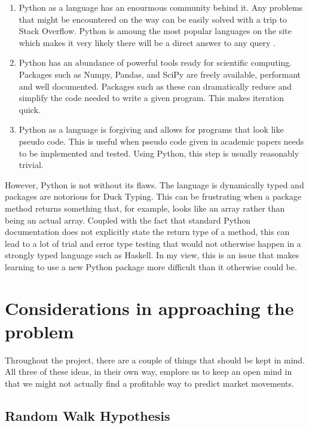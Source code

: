 \documentclass{report}
\begin{document}
\begin{enumerate}
  \item Python as a language has an enourmous community behind it. Any problems that might be encountered on the way can be easily solved with a trip to Stack Overflow. Python is amoung the most popular languages on the site which makes it very likely there will be a direct answer to any query \cite{website:redmonk-languages}. 
  
  \item Python has an abundance of powerful tools ready for scientific computing. Packages such as Numpy, Pandas, and SciPy are freely available, performant and well documented. Packages such as these can dramatically reduce and simplify the code needed to write a given program. This makes iteration quick.

  \item Python as a language is forgiving and allows for programs that look like pseudo code. This is useful when pseudo code given in academic papers needs to be implemented and tested. Using Python, this step is usually reasonably trivial.

\end{enumerate}

However, Python is not without its flaws. The language is dynamically typed and packages are notorious for Duck Typing. This can be frustrating when a package method returns something that, for example, looks like an array rather than being an actual array. Coupled with the fact that standard Python documentation does not explicitly state the return type of a method, this can lead to a lot of trial and error type testing that would not otherwise happen in a strongly typed language such as Haskell. In my view, this is an issue that makes learning to use a new Python package more difficult than it otherwise could be.

\chapter{Considerations in approaching the problem}

Throughout the project, there are a couple of things that should be kept in mind. All three of these ideas, in their own way, emplore us to keep an open mind in that we might not actually find a profitable way to predict market movements.

\section{Random Walk Hypothesis}
\end{document}
